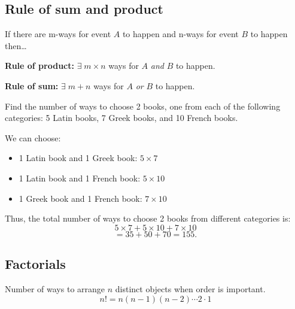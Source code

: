\subsection{Rule of sum and product}
    \begin{definition}
        If there are m-ways for event $A$ to happen and n-ways for event $B$ to happen then\dots
        \vspace{1em}

        \textbf{Rule of product:} $\exists \; m\times n$ ways for $A$ \emph{and} $B$ to happen. 
        \vspace{1em}

        \textbf{Rule of sum:} $\exists \; m + n$ ways for $A$ \emph{or} $B$ to happen. 
    \end{definition}

    \begin{example}
        Find the number of ways to choose 2 books, one from each of the following categories: 5 Latin books, 7 Greek books, and 10 French books.

        We can choose:
        \begin{itemize}
            \item 1 Latin book and 1 Greek book: \( 5 \times 7 \)
            \item 1 Latin book and 1 French book: \( 5 \times 10 \)
            \item 1 Greek book and 1 French book: \( 7 \times 10 \)
        \end{itemize}

        Thus, the total number of ways to choose 2 books from different categories is:
        \[
        5 \times 7 + 5 \times 10 + 7 \times 10
        \]
        \[
        = 35 + 50 + 70 = 155.
        \]
    \end{example}

\subsection{Factorials}
\begin{definition}
    Number of ways to arrange $n$ distinct objects when order is important.
    \begin{equation}
        n! = n(n-1)(n-2)\cdots 2\cdot 1
    \end{equation}
\end{definition}

